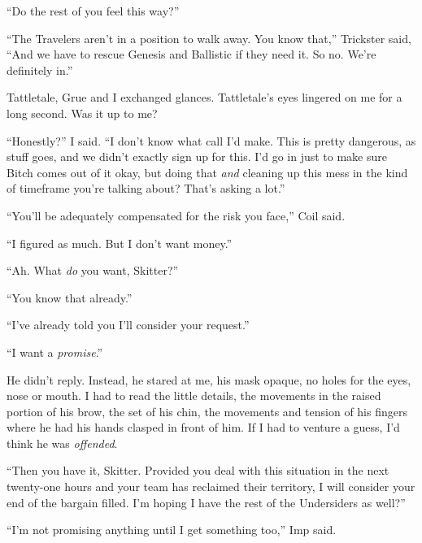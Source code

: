 ``Do the rest of you feel this way?''



``The Travelers aren't in a position to walk away.  You know that,'' Trickster said, ``And we have to rescue Genesis and Ballistic if they need it.  So no.  We're definitely in.''



Tattletale, Grue and I exchanged glances.  Tattletale's eyes lingered on me for a long second.  Was it up to me?



``Honestly?'' I said.  ``I don't know what call I'd make.  This is pretty dangerous, as stuff goes, and we didn't exactly sign up for this.  I'd go in just to make sure Bitch comes out of it okay, but doing that \emph{and} cleaning up this mess in the kind of timeframe you're talking about?  That's asking a lot.''



``You'll be adequately compensated for the risk you face,'' Coil said.



``I figured as much.  But I don't want money.''



``Ah.  What \emph{do} you want, Skitter?''



``You know that already.''



``I've already told you I'll consider your request.''



``I want a \emph{promise}.''



He didn't reply.  Instead, he stared at me, his mask opaque, no holes for the eyes, nose or mouth.  I had to read the little details, the movements in the raised portion of his brow, the set of his chin, the movements and tension of his fingers where he had his hands clasped in front of him.  If I had to venture a guess, I'd think he was \emph{offended}.



``Then you have it, Skitter.  Provided you deal with this situation in the next twenty-one hours and your team has reclaimed their territory, I will consider your end of the bargain filled.  I'm hoping I have the rest of the Undersiders as well?''



``I'm not promising anything until I get something too,'' Imp said.



